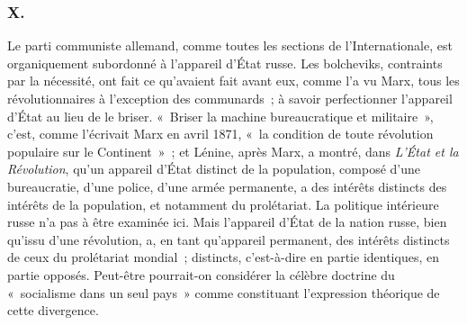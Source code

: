 \documentclass[french,twoside]{book} %
\begin{document}
\subsubsection[X.]{X.}
\noindent Le parti communiste allemand, comme toutes les sections de l'Internatio­nale, est organiquement subordonné à l'appareil d'État russe. Les bolcheviks, contraints par la nécessité, ont fait ce qu'avaient fait avant eux, comme l'a vu Marx, tous les révolutionnaires à l'exception des communards ; à savoir per­fectionner l'appareil d'État au lieu de le briser. « Briser la machine bureau­cratique et militaire », c'est, comme l'écrivait Marx en avril 1871, « la condition de toute révolution populaire sur le Continent » ; et Lénine, après Marx, a montré, dans {\itshape L'État et la Révolution}, qu'un appareil d'État distinct de la population, composé d'une bureaucratie, d'une police, d'une armée perma­nente, a des intérêts distincts des intérêts de la population, et notamment du prolétariat. La politique intérieure russe n'a pas à être examinée ici. Mais l'appareil d'État de la nation russe, bien qu'issu d'une révolution, a, en tant qu'appareil permanent, des intérêts distincts de ceux du prolétariat mondial ; distincts, c'est-à-dire en partie identiques, en partie opposés. Peut-être pourrait-on considérer la célèbre doctrine du « socialisme dans un seul pays » comme constituant l'expression théorique de cette divergence.\par
\end{document}
